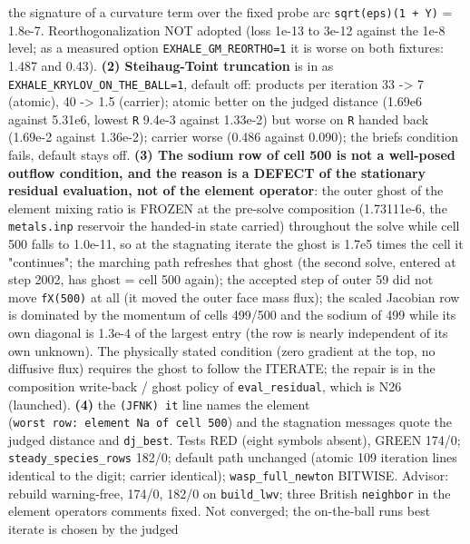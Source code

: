 \documentclass[english,a4paper]{my_memo}
\begin{document}
\begin{itemize}
  the signature of a curvature term over the fixed probe arc \texttt{sqrt(eps)(1\ +\ \textbar{}\textbar{}Y\textbar{}\textbar{})} = 1.8e-7. Reorthogonalization NOT adopted (loss 1e-13 to 3e-12
  against the 1e-8 level; as a measured option \texttt{EXHALE\_GM\_REORTHO=1} it is
  worse on both fixtures: 1.487 and 0.43). \textbf{(2) Steihaug-Toint truncation}
  is in as \texttt{EXHALE\_KRYLOV\_ON\_THE\_BALL=1}, default off: products per
  iteration 33 -\textgreater{} 7 (atomic), 40 -\textgreater{} 1.5 (carrier); atomic better on the
  judged distance (1.69e6 against 5.31e6, lowest \texttt{\textbar{}\textbar{}R\textbar{}\textbar{}} 9.4e-3 against
  1.33e-2) but worse on \texttt{\textbar{}\textbar{}R\textbar{}\textbar{}} handed back (1.69e-2 against 1.36e-2);
  carrier worse (0.486 against 0.090); the brief\textquotesingle s condition fails, default
  stays off. \textbf{(3) The sodium row of cell 500 is not a well-posed outflow
  condition, and the reason is a DEFECT of the stationary residual
  evaluation, not of the element operator}: the outer ghost of the element
  mixing ratio is FROZEN at the pre-solve composition (1.73111e-6, the
  \texttt{metals.inp} reservoir the handed-in state carried) throughout the solve
  while cell 500 falls to 1.0e-11, so at the stagnating iterate the ghost is
  1.7e5 times the cell it "continues"; the marching path refreshes that
  ghost (the second solve, entered at step 2002, has ghost = cell 500
  again); the accepted step of outer 59 did not move \texttt{fX(500)} at all (it
  moved the outer face mass flux); the scaled Jacobian row is dominated by
  the momentum of cells 499/500 and the sodium of 499 while its own
  diagonal is 1.3e-4 of the largest entry (the row is nearly independent
  of its own unknown). The physically stated condition (zero gradient at
  the top, no diffusive flux) requires the ghost to follow the ITERATE;
  the repair is in the composition write-back / ghost policy of
  \texttt{eval\_residual}, which is N26 (launched). \textbf{(4)} the \texttt{(JFNK)\ it} line
  names the element (\texttt{worst\ row:\ element\ Na\ of\ cell\ 500}) and the stagnation
  messages quote the judged distance and \texttt{dj\_best}. Tests RED (eight symbols
  absent), GREEN 174/0; \texttt{steady\_species\_rows} 182/0; default path unchanged
  (atomic 109 iteration lines identical to the digit; carrier identical);
  \texttt{wasp\_full\_newton} BITWISE. Advisor: rebuild warning-free, 174/0, 182/0 on
  \texttt{build\_lwv}; three British \texttt{neighbor} in the element operator\textquotesingle s comments
  fixed. Not converged; the on-the-ball run\textquotesingle s best iterate is chosen by the judged

\end{itemize}
\end{document}
